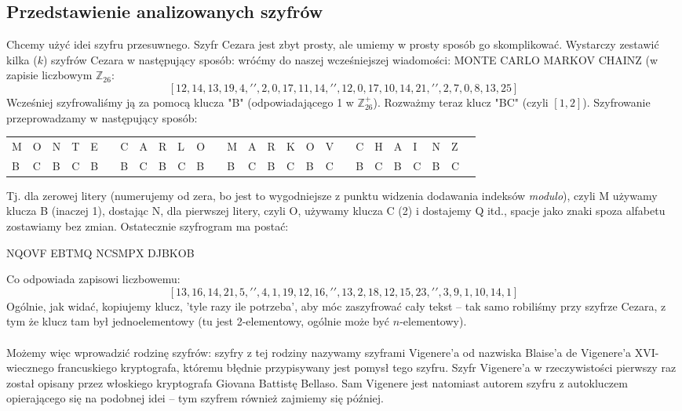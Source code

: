 \documentclass[a4paper]{article}
\begin{document}
\subsection{Przedstawienie analizowanych szyfrów}
Chcemy użyć idei szyfru przesuwnego. Szyfr Cezara jest zbyt prosty, ale umiemy w prosty sposób go skomplikować. Wystarczy zestawić kilka ($k$) szyfrów Cezara w następujący sposób:
wróćmy do naszej wcześniejszej wiadomości: MONTE CARLO MARKOV CHAINZ (w zapisie liczbowym $\mathbb{Z}_{26}$:
$$[12, 14, 13, 19, 4, ' ', 2, 0, 17, 11, 14, ' ', 12, 0, 17, 10, 14, 21, ' ', 2, 7, 0, 8, 13, 25]$$
Wcześniej szyfrowaliśmy ją za pomocą klucza "B" (odpowiadającego 1 w $\mathbb{Z}_{26}^+$). Rozważmy teraz klucz "BC" (czyli $[1, 2]$). Szyfrowanie przeprowadzamy w następujący sposób:
\begin{center}\begin{tabular}{|p{1.5mm}|p{1.5mm}|p{1.5mm}|p{1.5mm}|p{1.5mm}|p{1.5mm}|p{1.5mm}|p{1.5mm}|p{1.5mm}|p{1.5mm}|p{1.5mm}|p{1.5mm}|p{1.5mm}|p{1.5mm}|p{1.5mm}|p{1.5mm}|p{1.5mm}|p{1.5mm}|p{1.5mm}|p{1.5mm}|p{1.5mm}|p{1.5mm}|p{1.5mm}|p{1.5mm}|p{1.5mm}|p{1.5mm}|}
    M & O & N & T & E & & C & A & R & L & O & & M & A & R & K & O & V & & C & H & A & I & N & Z \\
    B & C & B & C & B & & B & C & B & C & B & & B & C & B & C & B & C & & B & C & B & C & B & C
\end{tabular}
\end{center}
Tj. dla zerowej litery (numerujemy od zera, bo jest to wygodniejsze z punktu widzenia dodawania indeksów \textit{modulo}), czyli M używamy klucza B (inaczej 1), dostając N, dla pierwszej litery, czyli O, używamy klucza C (2) i dostajemy Q itd., spacje jako znaki spoza alfabetu zostawiamy bez zmian. Ostatecznie szyfrogram ma postać:
\begin{center}
    NQOVF EBTMQ NCSMPX DJBKOB
\end{center}
Co odpowiada zapisowi liczbowemu:
$$ [13, 16, 14, 21, 5, ' ', 4, 1, 19, 12, 16, ' ', 13, 2, 18, 12, 15, 23, ' ', 3, 9, 1, 10, 14, 1]$$
Ogólnie, jak widać, kopiujemy klucz, 'tyle razy ile potrzeba', aby móc zaszyfrować cały tekst – tak samo robiliśmy przy szyfrze Cezara, z tym że klucz tam był jednoelementowy (tu jest 2-elementowy, ogólnie może być $n$-elementowy).\\\\
Możemy więc wprowadzić rodzinę szyfrów: szyfry z tej rodziny nazywamy szyframi Vigenere'a od nazwiska Blaise'a de Vigenere'a XVI-wiecznego francuskiego kryptografa, któremu błędnie przypisywany jest pomysł tego szyfru. Szyfr Vigenere'a w rzeczywistości pierwszy raz został opisany przez włoskiego kryptografa Giovana Battistę Bellaso. Sam Vigenere jest natomiast autorem szyfru z autokluczem opierającego się na podobnej idei – tym szyfrem również zajmiemy się później.\\\\
\end{document}

